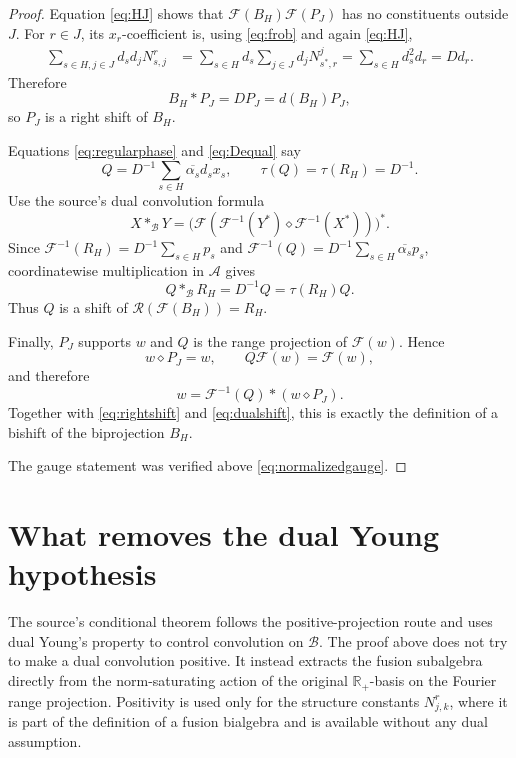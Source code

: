 \documentclass[11pt]{amsart}
\newcommand{\A}{\mathcal A}
\newcommand{\B}{\mathcal B}
\newcommand{\F}{\mathcal F}
\newcommand{\Rng}{\mathcal R}
\begin{document}
\begin{proof}
Equation \eqref{eq:HJ} shows that
$\F(B_H)\F(P_J)$ has no constituents outside $J$.  For $r\in J$, its
$x_r$-coefficient is, using \eqref{eq:frob} and again \eqref{eq:HJ},
\begin{align*}
 \sum_{s\in H,j\in J}d_sd_jN_{s,j}^r
 &=\sum_{s\in H}d_s\sum_{j\in J}d_jN_{s^*,r}^{j}
 =\sum_{s\in H}d_s^2d_r
 =Dd_r.
\end{align*}
Therefore
\begin{equation}\label{eq:rightshift}
 B_H*P_J=DP_J=d(B_H)P_J,
\end{equation}
so $P_J$ is a right shift of $B_H$.

Equations \eqref{eq:regularphase} and \eqref{eq:Dequal} say
\begin{equation}\label{eq:Qphase}
 Q=D^{-1}\sum_{s\in H}\overline{\alpha_s}d_sx_s,
 \qquad \tau(Q)=\tau(R_H)=D^{-1}.
\end{equation}
Use the source's dual convolution formula
\[
 X*_{\B}Y
 =\bigl(\F(\F^{-1}(Y^*)\diamond\F^{-1}(X^*))\bigr)^*.
\]
Since $\F^{-1}(R_H)=D^{-1}\sum_{s\in H}p_s$ and
$\F^{-1}(Q)=D^{-1}\sum_{s\in H}\overline{\alpha_s}p_s$, coordinatewise
multiplication in $\A$ gives
\begin{equation}\label{eq:dualshift}
 Q*_{\B}R_H=D^{-1}Q=\tau(R_H)Q.
\end{equation}
Thus $Q$ is a shift of $\Rng(\F(B_H))=R_H$.

Finally, $P_J$ supports $w$ and $Q$ is the range projection of $\F(w)$.
Hence
\[
 w\diamond P_J=w,
 \qquad
 Q\F(w)=\F(w),
\]
and therefore
\begin{equation}\label{eq:bishift}
 w=\F^{-1}(Q)*(w\diamond P_J).
\end{equation}
Together with \eqref{eq:rightshift} and \eqref{eq:dualshift}, this is exactly
the definition of a bishift of the biprojection $B_H$.

The gauge statement was verified above \eqref{eq:normalizedgauge}.
\end{proof}

\section*{What removes the dual Young hypothesis}

The source's conditional theorem follows the positive-projection route and
uses dual Young's property to control convolution on $\B$.  The proof above
does not try to make a dual convolution positive.  It instead extracts the
fusion subalgebra directly from the norm-saturating action of the original
$\mathbb R_+$-basis on the Fourier range projection.  Positivity is used only
for the structure constants $N_{j,k}^r$, where it is part of the definition
of a fusion bialgebra and is available without any dual assumption.
\end{document}
